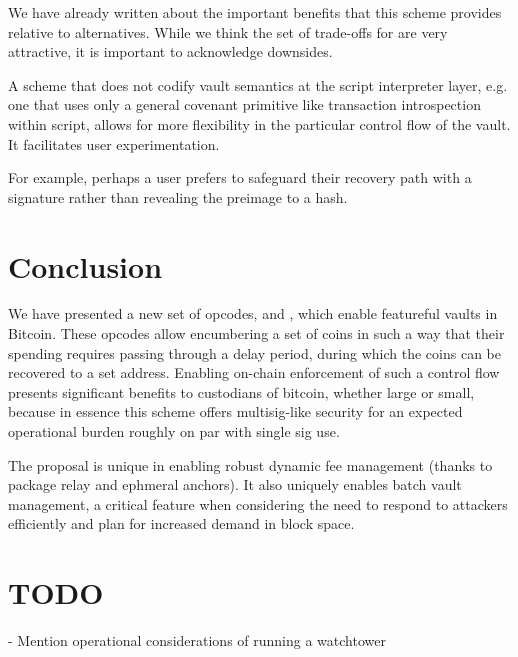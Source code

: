 \documentclass[10pt]{article}
\begin{document}
We have already written about the important benefits that this scheme provides relative
to alternatives. While we think the set of trade-offs for \opv{} are
very attractive, it is important to acknowledge downsides.

A scheme that does not codify vault semantics at the script interpreter layer, e.g. one
that uses only a general covenant primitive like transaction introspection within
script, allows for more flexibility in the particular control flow of the vault. It
facilitates user experimentation.

For example, perhaps a user prefers to safeguard their recovery path with a
signature rather than revealing the preimage to a \spk{} hash.

\section*{Conclusion}

We have presented a new set of opcodes, \opv{} and \opuv{}, which enable featureful
vaults in Bitcoin. These opcodes allow encumbering a set of coins in such a way that
their spending requires passing through a delay period, during which the coins can be
recovered to a set address. Enabling on-chain enforcement of such a control flow
presents significant benefits to custodians of bitcoin, whether large or small, because
in essence this scheme offers multisig-like security for an expected operational burden roughly
on par with single sig use.

The \opv{} proposal is unique in enabling robust dynamic fee management (thanks to
package relay and ephmeral anchors). It also uniquely enables batch vault management, a
critical feature when considering the need to respond to attackers efficiently and plan
for increased demand in block space.


\section*{TODO}

- Mention operational considerations of running a watchtower

\printbibliography
\end{document}
